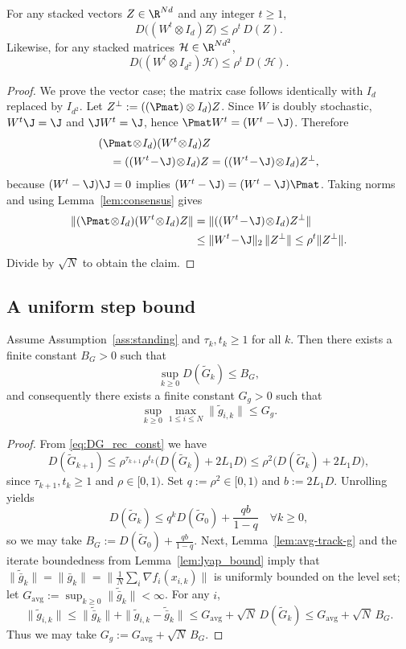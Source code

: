 \documentclass[review,onefignum,onetabnum]{siamart171218}
\begin{document}
\begin{lemma}\label{lem:mix_contract}
For any stacked vectors $Z\in\R^{Nd}$ and any integer $t\ge1$,
\[
D\big((W^t\otimes I_d)Z\big)\le \rho^t\,D(Z).
\]
Likewise, for any stacked matrices $\mathcal H\in\R^{Nd^2}$,
\[
D\big((W^t\otimes I_{d^2})\mathcal H\big)\le \rho^t\,D(\mathcal H).
\]
\end{lemma}
\begin{proof}
We prove the vector case; the matrix case follows identically with $I_d$ replaced by $I_{d^2}$.
Let $Z^\perp:=((\Pmat)\otimes I_d)Z$. Since $W$ is doubly stochastic, $W^t\J=\J$ and $\J W^t=\J$, hence
$\Pmat W^t=(W^t-\J)$. Therefore
\begin{align*}
&(\Pmat\!\otimes\! I_d)(W^t\!\otimes\! I_d)Z\\
&\quad=((W^t\!-\!\J)\!\otimes\! I_d)Z=((W^t\!-\!\J)\!\otimes\! I_d)Z^\perp,
\end{align*}
because $(W^t-\J)\J=0$ implies $(W^t-\J)=(W^t-\J)\Pmat$.
Taking norms and using Lemma~\ref{lem:consensus} gives
\begin{align*}
\|(\Pmat\!\otimes\! I_d)(W^t\!\otimes\! I_d)Z\|
&=\|((W^t\!-\!\J)\!\otimes\! I_d)Z^\perp\|\\
&\le \|W^t\!-\!\J\|_2\,\|Z^\perp\|
\le \rho^t\|Z^\perp\|.
\end{align*}
Divide by $\sqrt N$ to obtain the claim.
\end{proof}

\subsection{A uniform step bound}

\begin{lemma}\label{lem:tilde_track_bounded}
Assume Assumption~\ref{ass:standing} and $\tau_k,t_k\ge 1$ for all $k$.
Then there exists a finite constant $B_G>0$ such that
\[
\sup_{k\ge 0} D(\tilde G_k)\le B_G,
\]
and consequently there exists a finite constant $G_g>0$ such that
\[
\sup_{k\ge 0}\max_{1\le i\le N}\|\tilde g_{i,k}\|\le G_g.
\]
\end{lemma}
\begin{proof}
From \eqref{eq:DG_rec_const} we have
\[
D(\tilde G_{k+1})\le \rho^{\tau_{k+1}}\rho^{t_k}\big(D(\tilde G_k)+2L_1D\big)\le \rho^2\big(D(\tilde G_k)+2L_1D\big),
\]
since $\tau_{k+1},t_k\ge 1$ and $\rho\in[0,1)$.
Set $q:=\rho^2\in[0,1)$ and $b:=2L_1D$. Unrolling yields
\[
D(\tilde G_k)\le q^k D(\tilde G_0)+\frac{qb}{1-q}\quad\forall k\ge 0,
\]
so we may take $B_G:=D(\tilde G_0)+\frac{qb}{1-q}$.
Next, Lemma~\ref{lem:avg-track-g} and the iterate boundedness from Lemma~\ref{lem:lyap_bound} imply that
$\|\tilde{\bar g}_k\|=\|\bar g_k\|=\big\|\frac1N\sum_i \nabla f_i(x_{i,k})\big\|$ is uniformly bounded on the level set;
let $G_{\mathrm{avg}}:=\sup_{k\ge 0}\|\tilde{\bar g}_k\|<\infty$.
For any $i$,
\[
\|\tilde g_{i,k}\|\le \|\tilde{\bar g}_k\|+\|\tilde g_{i,k}-\tilde{\bar g}_k\|
\le G_{\mathrm{avg}}+\sqrt N\,D(\tilde G_k)\le G_{\mathrm{avg}}+\sqrt N\,B_G.
\]
Thus we may take $G_g:=G_{\mathrm{avg}}+\sqrt N\,B_G$.
\end{proof}
\end{document}
